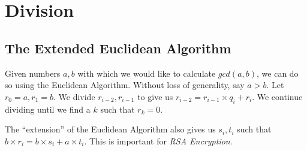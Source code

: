 \chapter{Division}

\section{The Extended Euclidean Algorithm}

Given numbers $a,b$ with which we would like to calculate $gcd(a,b)$,
we can do so using the Euclidean Algorithm.  Without loss of
generality, say $ a > b $.  Let $r_0 = a, r_1 = b$.  We divide
$r_{i-2},r_{i-1}$ to give us $r_{i-2} = r_{i-1} \times q_i + r_i$.  We
continue dividing until we find a $k$ such that $r_k = 0$.

The ``extension'' of the Euclidean Algorithm also gives us $s_i, t_i$
such that $ b \times r_i = b \times s_i + a \times t_i $.  This is
important for \emph{RSA Encryption}.
